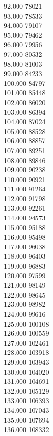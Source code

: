 { 92.000	78021 \\
 93.000	78533 \\
 94.000	79107 \\
 95.000	79462 \\
 96.000	79956 \\
 97.000	80532 \\
 98.000	81003 \\
 99.000	84233 \\
 100.000	84797 \\
 101.000	85448 \\
 102.000	86020 \\
 103.000	86394 \\
 104.000	87024 \\
 105.000	88528 \\
 106.000	88857 \\
 107.000	89251 \\
 108.000	89846 \\
 109.000	90238 \\
 110.000	90921 \\
 111.000	91264 \\
 112.000	91798 \\
 113.000	92261 \\
 114.000	94573 \\
 115.000	95188 \\
 116.000	95498 \\
 117.000	96038 \\
 118.000	96403 \\
 119.000	96883 \\
 120.000	97599 \\
 121.000	98149 \\
 122.000	98645 \\
 123.000	98982 \\
 124.000	99616 \\
 125.000	100108 \\
 126.000	100559 \\
 127.000	102461 \\
 128.000	103918 \\
 129.000	103943 \\
 130.000	104020 \\
 131.000	104691 \\
 132.000	105129 \\
 133.000	106393 \\
 134.000	107043 \\
 135.000	107694 \\
 136.000	108332 \\
}
